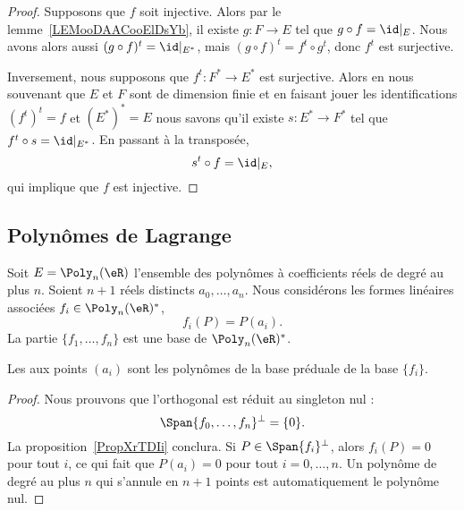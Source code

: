\begin{proof}
	Supposons que \( f\) soit injective. Alors par le lemme~\ref{LEMooDAACooElDsYb}, il existe \( g\colon F\to E\) tel que \( g\circ f=\id|_E\). Nous avons alors aussi \( (g\circ f)^t=\id|_{E^*}\), mais \( (g\circ f)^t=f^t\circ g^t\), donc \( f^t\) est surjective.

	Inversement, nous supposons que \( f^t\colon F^*\to E^*\) est surjective. Alors en nous souvenant que \( E\) et \( F\) sont de dimension finie et en faisant jouer les identifications \( (f^t)^t=f\) et \( (E^*)^*=E\) nous savons qu'il existe \( s\colon E^*\to F^*\) tel que \( f^t\circ s=\id|_{E^*}\). En passant à la transposée,
	\begin{equation}
		s^t\circ f=\id|_{E},
	\end{equation}
	qui implique que \( f\) est injective.
\end{proof}

\subsection{Polynômes de Lagrange}

\begin{lemmaDef}
	Soit \( E=\Poly_n(\eR)\) l'ensemble des polynômes à coefficients réels de degré au plus \( n\). Soient \( n+1\) réels distincts \( a_0,\ldots, a_n\). Nous considérons les formes linéaires associées \( f_i\in \Poly_n(\eR)^*\),
	\begin{equation}
		f_i(P)=P(a_i).
	\end{equation}
	La partie \( \{ f_1,\ldots, f_n \}\) est une base de \( \Poly_n(\eR)^*\).

	Les  aux points \( (a_i)\) sont les polynômes de la base préduale de la base \( \{ f_i \}\).
\end{lemmaDef}

\begin{proof}
	Nous prouvons que l'orthogonal est réduit au singleton nul :
	\begin{equation}
		\Span\{ f_0,\ldots, f_n \}^{\perp}=\{ 0 \}.
	\end{equation}
	La proposition~\ref{PropXrTDIi} conclura. Si \( P\in\Span\{ f_i \}^{\perp}\), alors \( f_i(P)=0\) pour tout \( i\), ce qui fait que \( P(a_i)=0\) pour tout \( i=0,\ldots, n\). Un polynôme de degré au plus \( n\) qui s'annule en \( n+1\) points est automatiquement le polynôme nul.
\end{proof}

